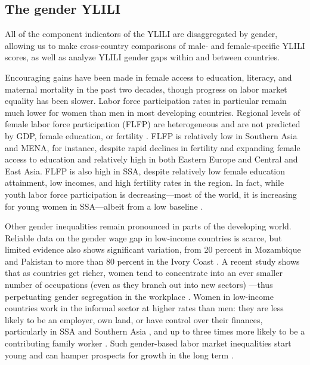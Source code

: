 \documentclass[
  a4paper, twoside, 12pt]{book}
\begin{document}
\hypertarget{the-gender-ylili}{%
\subsection{The gender YLILI}\label{the-gender-ylili}}

All of the component indicators of the YLILI are disaggregated by gender, allowing us to make cross-country comparisons of male- and female-specific YLILI scores, as well as analyze YLILI gender gaps within and between countries.

Encouraging gains have been made in female access to education, literacy, and maternal mortality in the past two decades, though progress on labor market equality has been slower. Labor force participation rates in particular remain much lower for women than men in most developing countries. Regional levels of female labor force participation (FLFP) are heterogeneous and are not predicted by GDP, female education, or fertility \autocite{klasen2019}. FLFP is relatively low in Southern Asia and MENA, for instance, despite rapid declines in fertility and expanding female access to education and relatively high in both Eastern Europe and Central and East Asia. FLFP is also high in SSA, despite relatively low female education attainment, low incomes, and high fertility rates in the region. In fact, while youth labor force participation is decreasing---most of the world, it is increasing for young women in SSA---albeit from a low baseline \autocite{ilo2023b}.

Other gender inequalities remain pronounced in parts of the developing world. Reliable data on the gender wage gap in low-income countries is scarce, but limited evidence also shows significant variation, from 20 percent in Mozambique and Pakistan to more than 80 percent in the Ivory Coast \autocite{worldbank2011}. A recent study shows that as countries get richer, women tend to concentrate into an ever smaller number of occupations (even as they branch out into new sectors) ---thus perpetuating gender segregation in the workplace \autocite{borrowman2020}. Women in low-income countries work in the informal sector at higher rates than men: they are less likely to be an employer, own land, or have control over their finances, particularly in SSA and Southern Asia \autocite{ortiz-ospina2018}, and up to three times more likely to be a contributing family worker \autocite{bonnet2018}. Such gender-based labor market inequalities start young and can hamper prospects for growth in the long term \autocite{undp2019}.
\end{document}
